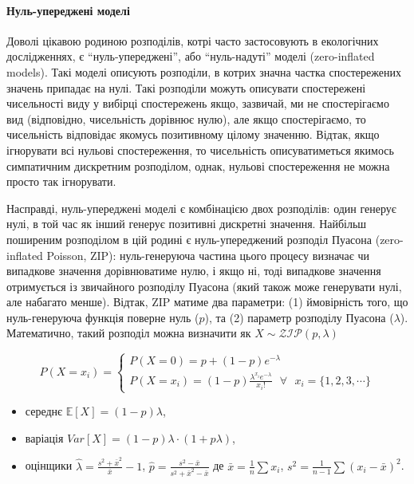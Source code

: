\documentclass[
  11pt,
]{book}
\begin{document}
\paragraph{Нуль-упереджені моделі}\label{ux43dux443ux43bux44c-ux443ux43fux435ux440ux435ux434ux436ux435ux43dux456-ux43cux43eux434ux435ux43bux456}

Доволі цікавою родиною розподілів, котрі часто застосовують в екологічних дослідженнях, є ``нуль-упереджені'', або ``нуль-надуті'' моделі (zero-inflated models). Такі моделі описують розподіли, в котрих значна частка спостережених значень припадає на нулі. Такі розподіли можуть описувати спостережені чисельності виду у вибірці спостережень якщо, зазвичай, ми не спостерігаємо вид (відповідно, чисельність дорівнює нулю), але якщо спостерігаємо, то чисельність відповідає якомусь позитивному цілому значенню. Відтак, якщо ігнорувати всі нульові спостереження, то чисельність описуватиметься якимось симпатичним дискретним розподілом, однак, нульові спостереження не можна просто так ігнорувати.

Насправді, нуль-упереджені моделі є комбінацією двох розподілів: один генерує нулі, в той час як інший генерує позитивні дискретні значення. Найбільш поширеним розподілом в цій родині є нуль-упереджений розподіл Пуасона (zero-inflated Poisson, ZIP): нуль-генеруюча частина цього процесу визначає чи випадкове значення дорівнюватиме нулю, і якщо ні, тоді випадкове значення отримується із звичайного розподілу Пуасона (який також може генерувати нулі, але набагато менше). Відтак, ZIP матиме два параметри: (1) ймовірність того, що нуль-генеруюча функція поверне нуль (\(p\)), та (2) параметр розподілу Пуасона (\(\lambda\)). Математично, такий розподіл можна визначити як \(X \sim \mathcal{ZIP}(p, \lambda)\)

\[
P(X = x_i) = 
\begin{cases}
P(X = 0) = p + (1-p)e^{-\lambda}\\
P(X = x_i) = (1 - p) \frac{\lambda^{x_i} e^{-\lambda}}{x_i!} \text{ } \forall \text{ } x_i = \{1, 2, 3, \cdots\}
\end{cases}
\]

\begin{itemize}
\item
  середнє \(\mathbb{E} [X] = (1-p) \lambda\),
\item
  варіація \(Var[X] = (1-p)\lambda \cdot (1+p \lambda)\),
\item
  оцінщики \(\hat{\lambda} = \frac{s^2 + \bar{x}^2}{\bar{x}} - 1\), \(\hat{p} = \frac{s^2 - \bar{x}}{s^2 + \bar{x}^2 - \bar{x}}\) де \(\bar{x} = \frac{1}{n} \sum x_i\), \(s^2 = \frac{1}{n - 1} \sum (x_i - \bar{x})^2\).
\end{itemize}
\end{document}
